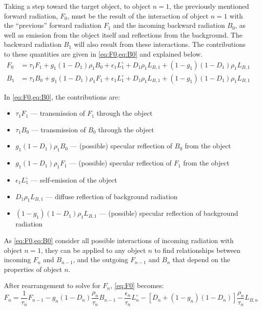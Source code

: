 \documentclass[11pt,a4paper]{article}
\begin{document}
Taking a step toward the target object, to object $ n=1 $, the previously mentioned forward radiation, $ F_0 $, must be the result of the interaction of object $ n=1 $ with the ``previous'' forward radiation $ F_1 $ and the incoming backward radiation $ B_0 $, as well as emission from the object itself and reflections from the background. The backward radiation $ B_1 $ will also result from these interactions. The contributions to these quantities are given in \cref{eq:F0,eq:B0} and explained below.
\begin{align}
	F_0 &= \tau_1 F_1 + g_1 \left(1 - D_1\right) \rho_1 B_0 + \epsilon_1 L^\circ_1 + D_1 \rho_1 L_{B,1} + \left(1 - g_1\right)\left(1 - D_1\right) \rho_1 L_{B,1} \label{eq:F0}\\
	B_1 &= \tau_1 B_0 + g_1 \left(1 - D_1\right) \rho_1 F_1 + \epsilon_1 L^\circ_1 + D_1 \rho_1 L_{B,1} + \left(1 - g_1\right)\left(1 - D_1\right) \rho_1 L_{B,1} \label{eq:B0}
\end{align}

In \cref{eq:F0,eq:B0}, the contributions are:
\begin{itemize}
	\item $ \tau_1 F_1 $ --- transmission of $ F_1 $ through the object
	\item $ \tau_1 B_0 $ --- transmission of $ B_0 $ through the object
	\item $ g_1 \left(1 - D_1\right) \rho_1 B_0 $ --- (possible) specular reflection of $ B_0 $ from the object
	\item $ g_1 \left(1 - D_1\right) \rho_1 F_1 $ --- (possible) specular reflection of $ F_1 $ from the object
	\item $ \epsilon_1 L^\circ_1 $ --- self-emission of the object
	\item $ D_1 \rho_1 L_{B,1} $ --- diffuse reflection of background radiation
	\item $ \left(1 - g_1\right)\left(1 - D_1\right) \rho_1 L_{B,1} $ --- (possible) specular reflection of background radiation
\end{itemize}

As \cref{eq:F0,eq:B0} consider all possible interactions of incoming radiation with object $ n=1 $, they can be applied to any object $ n $ to find relationships between incoming $ F_n $ and $ B_{n-1} $, and the outgoing $ F_{n-1} $ and $ B_n $ that depend on the properties of object $ n $.

After rearrangement to solve for $ F_n $, \cref{eq:F0} becomes:
\begin{equation}\label{eq:Fn}
	F_n = \frac{1}{\tau_n} F_{n-1} - g_n \left(1 - D_n\right) \frac{\rho_n}{\tau_n} B_{n-1} - \frac{\epsilon_n}{\tau_n} L^\circ_n - \left[D_n + \left(1 - g_n\right)\left(1 - D_n\right)\right] \frac{\rho_n}{\tau_n} L_{B,n}
\end{equation}
\end{document}
